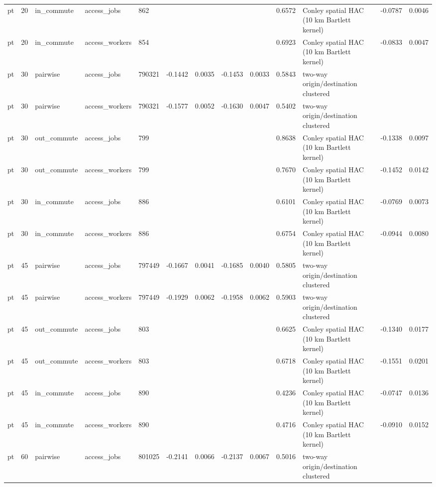 \begin{table}[htbp]
\begin{tabular}{lllllllllllll}
pt & 20 & in\_commute & access\_jobs & 862 &  &  &  &  & 0.6572 & Conley spatial HAC (10 km Bartlett kernel) & -0.0787 & 0.0046 \\
pt & 20 & in\_commute & access\_workers & 854 &  &  &  &  & 0.6923 & Conley spatial HAC (10 km Bartlett kernel) & -0.0833 & 0.0047 \\
pt & 30 & pairwise & access\_jobs & 790321 & -0.1442 & 0.0035 & -0.1453 & 0.0033 & 0.5843 & two-way origin/destination clustered &  &  \\
pt & 30 & pairwise & access\_workers & 790321 & -0.1577 & 0.0052 & -0.1630 & 0.0047 & 0.5402 & two-way origin/destination clustered &  &  \\
pt & 30 & out\_commute & access\_jobs & 799 &  &  &  &  & 0.8638 & Conley spatial HAC (10 km Bartlett kernel) & -0.1338 & 0.0097 \\
pt & 30 & out\_commute & access\_workers & 799 &  &  &  &  & 0.7670 & Conley spatial HAC (10 km Bartlett kernel) & -0.1452 & 0.0142 \\
pt & 30 & in\_commute & access\_jobs & 886 &  &  &  &  & 0.6101 & Conley spatial HAC (10 km Bartlett kernel) & -0.0769 & 0.0073 \\
pt & 30 & in\_commute & access\_workers & 886 &  &  &  &  & 0.6754 & Conley spatial HAC (10 km Bartlett kernel) & -0.0944 & 0.0080 \\
pt & 45 & pairwise & access\_jobs & 797449 & -0.1667 & 0.0041 & -0.1685 & 0.0040 & 0.5805 & two-way origin/destination clustered &  &  \\
pt & 45 & pairwise & access\_workers & 797449 & -0.1929 & 0.0062 & -0.1958 & 0.0062 & 0.5903 & two-way origin/destination clustered &  &  \\
pt & 45 & out\_commute & access\_jobs & 803 &  &  &  &  & 0.6625 & Conley spatial HAC (10 km Bartlett kernel) & -0.1340 & 0.0177 \\
pt & 45 & out\_commute & access\_workers & 803 &  &  &  &  & 0.6718 & Conley spatial HAC (10 km Bartlett kernel) & -0.1551 & 0.0201 \\
pt & 45 & in\_commute & access\_jobs & 890 &  &  &  &  & 0.4236 & Conley spatial HAC (10 km Bartlett kernel) & -0.0747 & 0.0136 \\
pt & 45 & in\_commute & access\_workers & 890 &  &  &  &  & 0.4716 & Conley spatial HAC (10 km Bartlett kernel) & -0.0910 & 0.0152 \\
pt & 60 & pairwise & access\_jobs & 801025 & -0.2141 & 0.0066 & -0.2137 & 0.0067 & 0.5016 & two-way origin/destination clustered &  &  \\

\end{tabular}
\end{table}
